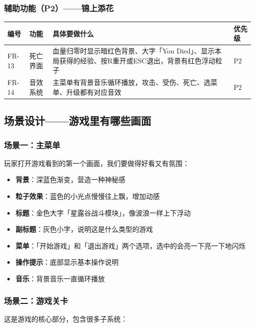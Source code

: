 \documentclass[12pt,a4paper]{article}
\begin{document}
\subsubsection{辅助功能（P2）——锦上添花}

\begin{longtable}{p{1.2cm}p{2.5cm}p{7cm}p{1.2cm}}
\toprule
\textbf{编号} & \textbf{功能} & \textbf{具体要做什么} & \textbf{优先级} \\
\midrule
\endhead
FR-13 & 死亡界面 & 血量归零时显示暗红色背景、大字「You Died」、显示本局获得的经验、按R重开或ESC退出，背景有红色浮动粒子 & P2 \\
FR-14 & 音效系统 & 主菜单有背景音乐循环播放，攻击、受伤、死亡、选菜单、升级都有对应音效 & P2 \\
\bottomrule
\end{longtable}

\subsection{场景设计——游戏里有哪些画面}

\subsubsection{场景一：主菜单}

玩家打开游戏看到的第一个画面，我们要做得好看又有氛围：

\begin{itemize}[leftmargin=2em]
    \item \textbf{背景}：深蓝色渐变，营造一种神秘感
    \item \textbf{粒子效果}：蓝色的小光点慢慢往上飘，增加动感
    \item \textbf{标题}：金色大字「星露谷战斗模块」，像波浪一样上下浮动
    \item \textbf{副标题}：灰色小字，说明这是什么类型的游戏
    \item \textbf{菜单}：「开始游戏」和「退出游戏」两个选项，选中的会亮一下亮一下地闪烁
    \item \textbf{操作提示}：底部显示基本操作说明
    \item \textbf{音乐}：背景音乐一直循环播放
\end{itemize}

\subsubsection{场景二：游戏关卡}

这是游戏的核心部分，包含很多子系统：
\end{document}
